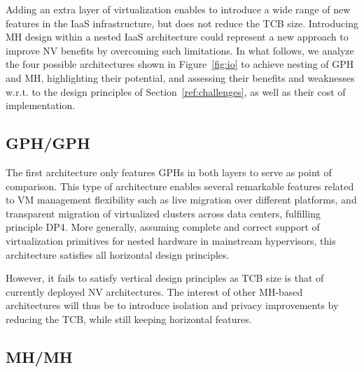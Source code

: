 \documentclass{sig-alternate}
\begin{document}
\noindent Adding an extra layer of virtualization enables to introduce a wide range of new features in the IaaS infrastructure, but does not reduce the TCB size. Introducing MH design within a nested IaaS architecture could represent a new approach to improve NV benefits by overcoming such limitations. In what follows, we analyze the four possible architectures shown in Figure~\ref{fig:io} to achieve nesting of GPH and MH, highlighting their potential, and assessing their benefits and weaknesses w.r.t. to the design principles of Section~\ref{ref:challenges}, as well as their cost of implementation.

\subsection{GPH/GPH}

\noindent The first architecture only features GPHs in both layers to serve as point of comparison. This type of architecture enables several remarkable features related to VM management flexibility such as live migration over different platforms, and transparent migration of virtualized clusters across data centers, fulfilling principle DP4. More generally, assuming complete and correct support of virtualization primitives for nested hardware in mainstream hypervisors, this architecture satisfies all horizontal design principles. 

However, it fails to satisfy vertical design principles as TCB size is that of currently deployed NV architectures. The interest of other MH-based architectures will thus be to introduce isolation and privacy improvements by reducing the TCB, while still keeping horizontal features.


\subsection{MH/MH}
\end{document}
